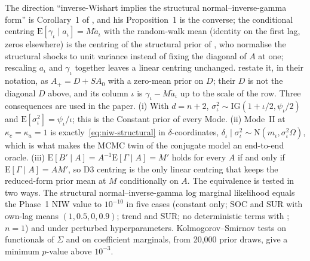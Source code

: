 The direction ``inverse-Wishart implies the structural normal--inverse-gamma form'' is Corollary~1
of \citet{chan2022asymmetric}, and his Proposition~1 is the converse; the conditional centring
$\mathrm{E}[\gamma_\iota \mid a_\iota] = M\tilde a_\iota$ with the random-walk mean (identity on the
first lag, zeros elsewhere) is the centring of the structural prior of \citet{sims1998bayesian}, who
normalise the structural shocks to unit variance instead of fixing the diagonal of $A$ at one;
rescaling $a_\iota$ and $\gamma_\iota$ together leaves a linear centring unchanged.
\citet{sims2006were} restate it, in their notation, as $A_+ = D + SA_0$ with a zero-mean prior on
$D$; their $D$ is not the diagonal $D$ above, and its column $\iota$ is $\gamma_\iota - M\tilde
a_\iota$ up to the scale of the row.
Three consequences are used in the paper.
(i) With $d = n + 2$, $\sigma_\iota^2 \sim \mathrm{IG}(1 + \iota/2, \psi_\iota/2)$ and
$\mathrm{E}[\sigma_\iota^2] = \psi_\iota/\iota$; this is the Constant prior of every Mode.
(ii) Mode~II at $\kappa_c = \kappa_a = 1$ is exactly~\eqref{eq:niw-structural} in
$\delta$-coordinates, $\delta_\iota \mid \sigma^2_\iota \sim \mathrm{N}(m_\iota, \sigma_\iota^2
\Omega)$, which is what makes the MCMC twin of the conjugate model an end-to-end oracle.
(iii) $\mathrm{E}[B' \mid A] = A^{-1}\mathrm{E}[\Gamma \mid A] = M'$ holds for every $A$ if and only
if $\mathrm{E}[\Gamma \mid A] = AM'$, so D3 centring is the only linear centring that keeps the
reduced-form prior mean at $M$ conditionally on $A$.
The equivalence is tested in two ways.
The structural normal--inverse-gamma log marginal likelihood equals the Phase~1 NIW value to
$10^{-10}$ in five cases (constant only; SOC and SUR with own-lag means $(1, 0.5, 0, 0.9)$; trend
and SUR; no deterministic terms with ; $n = 1$) and under perturbed
hyperparameters.
Kolmogorov--Smirnov tests on functionals of $\Sigma$ and on coefficient marginals, from 20,000 prior
draws, give a minimum $p$-value above $10^{-3}$.

